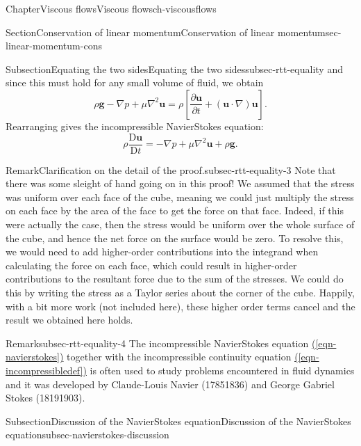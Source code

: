\documentclass[oneside,10pt,]{book}
\newcommand{\xreffont}{\relax}
\numberwithin{equation}{section}
\newcommand{\DD}[2]{\frac{\mathrm{D}#1}{\mathrm{D}#2}}
\newcommand{\pd}[2]{\frac{\partial#1}{\partial#2}}
\newcommand{\bu}{\boldsymbol{u}}
\newcommand{\bg}{\boldsymbol{g}}
\begin{document}
\begin{chapterptx}{Chapter}{Viscous flows}{}{Viscous flows}{}{}{ch-viscousflows}
\begin{sectionptx}{Section}{Conservation of linear momentum}{}{Conservation of linear momentum}{}{}{sec-linear-momentum-cons}
\begin{subsectionptx}{Subsection}{Equating the two sides}{}{Equating the two sides}{}{}{subsec-rtt-equality}
and since this must hold for any small volume of fluid, we obtain%
\begin{equation*}
\rho\bg-\nabla p + \mu\nabla^2\bu=\rho\left[ \pd{\bu}{t} + (\bu\cdot\nabla)\bu\right].
\end{equation*}
Rearranging gives the incompressible Navier\textendash{}Stokes equation:%
\begin{equation}
\boxed{\rho\DD{\bu}{t}
=-\nabla p+\mu\nabla^2\bu+\rho{\bg}.}\label{eqn-navierstokes}
\end{equation}
%
\begin{remark}{Remark}{Clarification on the detail of the proof.}{subsec-rtt-equality-3}%
Note that there was some sleight of hand going on in this proof! We assumed that the stress was uniform over each face of the cube, meaning we could just multiply the stress on each face by the area of the face to get the force on that face. Indeed, if this were actually the case, then the stress would be uniform over the whole surface of the cube, and hence the net force on the surface would be zero. To resolve this, we would need to add higher-order contributions into the integrand when calculating the force on each face, which could result in higher-order contributions to the resultant force due to the sum of the stresses. We could do this by writing the stress as a Taylor series about the corner of the cube. Happily, with a bit more work (not included here), these higher order terms cancel and the result we obtained here holds.%
\end{remark}
\begin{remark}{Remark}{}{subsec-rtt-equality-4}%
The incompressible Navier\textendash{}Stokes equation \hyperref[eqn-navierstokes]{({\xreffont\ref{eqn-navierstokes}})} together with the incompressible continuity equation \hyperref[eqn-incompressibledef]{({\xreffont\ref{eqn-incompressibledef}})} is often used to study problems encountered in fluid dynamics and it was developed by Claude-Louis Navier (1785\textendash{}1836) and George Gabriel Stokes (1819\textendash{}1903).%
\end{remark}
\end{subsectionptx}
%
%
\typeout{************************************************}
\typeout{************************************************}
%
\begin{subsectionptx}{Subsection}{Discussion of the Navier\textendash{}Stokes equation}{}{Discussion of the Navier\textendash{}Stokes equation}{}{}{subsec-navierstokes-discussion}

\end{subsectionptx}
\end{sectionptx}
\end{chapterptx}
\end{document}
